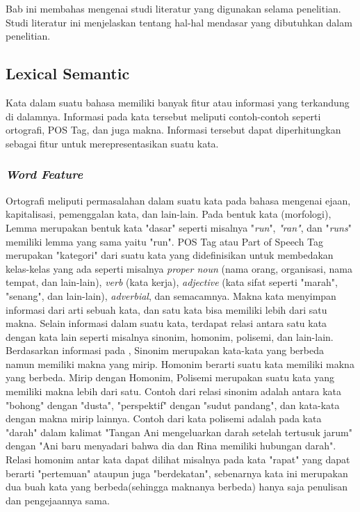 \chapter{\babDua}
Bab ini membahas mengenai studi literatur yang digunakan selama penelitian. Studi literatur ini menjelaskan tentang hal-hal mendasar yang dibutuhkan dalam penelitian.

\section{Lexical Semantic}

Kata dalam suatu bahasa memiliki banyak fitur atau informasi yang terkandung di dalamnya. Informasi pada kata tersebut meliputi contoh-contoh seperti ortografi, POS Tag, dan juga makna. Informasi tersebut dapat diperhitungkan sebagai fitur untuk merepresentasikan suatu kata.

\subsection{\textit{Word Feature}}
Ortografi meliputi permasalahan dalam suatu kata pada bahasa mengenai ejaan, kapitalisasi, pemenggalan kata, dan lain-lain. Pada bentuk kata (morfologi), Lemma merupakan bentuk kata "dasar" seperti misalnya "\textit{run}", \textit{"ran"}, dan "\textit{runs}" memiliki lemma yang sama yaitu "run". POS Tag atau Part of Speech Tag merupakan "kategori" dari suatu kata yang didefinisikan untuk membedakan kelas-kelas yang ada seperti misalnya \textit{proper noun} (nama orang, organisasi, nama tempat, dan lain-lain), \textit{verb} (kata kerja), \textit{adjective} (kata sifat seperti "marah", "senang", dan lain-lain), \textit{adverbial}, dan semacamnya. Makna kata menyimpan informasi dari arti sebuah kata, dan satu kata bisa memiliki lebih dari satu makna. Selain informasi dalam suatu kata, terdapat relasi antara satu kata dengan kata lain seperti misalnya sinonim, homonim, polisemi, dan lain-lain. Berdasarkan informasi pada \citep{sheeba2013unsupervised}, Sinonim merupakan kata-kata yang berbeda namun memiliki makna yang mirip. Homonim berarti suatu kata memiliki makna yang berbeda. Mirip dengan Homonim, Polisemi merupakan suatu kata yang memiliki makna lebih dari satu. Contoh dari relasi sinonim adalah antara kata "bohong" dengan "dusta", "perspektif" dengan "sudut pandang", dan kata-kata dengan makna mirip lainnya. Contoh dari kata polisemi adalah pada kata "darah" dalam kalimat "Tangan Ani mengeluarkan darah setelah tertusuk jarum" dengan "Ani baru menyadari bahwa dia dan Rina memiliki hubungan darah". Relasi homonim antar kata dapat dilihat misalnya pada kata "rapat" yang dapat berarti "pertemuan" ataupun juga "berdekatan", sebenarnya kata ini merupakan dua buah kata yang berbeda(sehingga maknanya berbeda) hanya saja penulisan dan pengejaannya sama.

